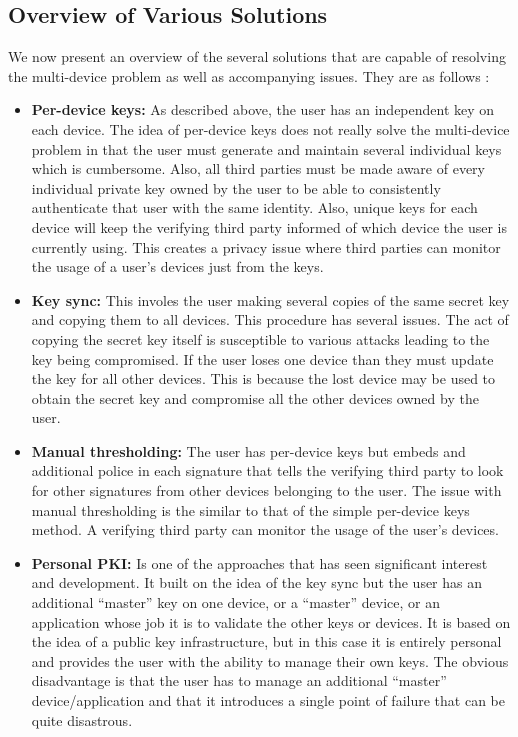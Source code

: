 \subsection{Overview of Various Solutions}
We now present an overview of the several solutions that are capable of resolving the multi-device problem as well as accompanying issues. They are as follows \cite{Atwater2016}:

\begin{itemize}

	\item \textbf{Per-device keys:} As described above, the user has an independent key on each device. The idea of per-device keys does not 				really solve the multi-device problem in that the user must generate and maintain several individual keys which is cumbersome. Also, all third 				parties must be made aware of every individual private key owned by the user to be able to consistently authenticate that user with the same 			identity. Also, unique keys for each device will keep the verifying third party informed of which device the user is currently using. This creates a 			privacy issue where third parties can monitor the usage of a user's devices just from the keys.\\

	\item \textbf{Key sync:} This involes the user making several copies of the same secret key and copying them to all devices. This procedure 				has several issues. The act of copying the secret key itself is susceptible to various attacks leading to the key being compromised. If the user 			loses one device than they must update the key for all other devices. This is because the lost device may be used to obtain the secret key and 			compromise all the other devices owned by the user.\\

	\item \textbf{Manual thresholding:} The user has per-device keys but embeds and additional police in each signature that tells the verifying 				third party to look for other signatures from other devices belonging to the user. The issue with manual thresholding is the similar to that of 				the simple per-device keys method. A verifying third party can monitor the usage of the user's devices.\\

	\item \textbf{Personal PKI:} Is one of the approaches that has seen significant interest and development. It built on the idea of the key sync 				but the user has an additional ``master'' key on one device, or a ``master'' device, or an application whose job it is to validate the other keys 			or devices. It is based on the idea of a public key infrastructure, but in this case it is entirely personal and provides the user with the 							ability to manage their own keys.  The obvious disadvantage is that the user has to manage an 							additional ``master'' device/application and that it introduces a single point of failure that can be quite disastrous.\\


\end{itemize}
